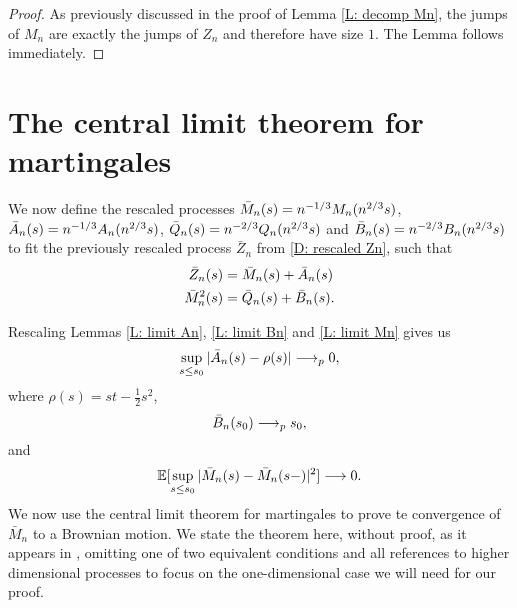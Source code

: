 \begin{proof} \label{P: limit Mn}
	As previously discussed in the proof of Lemma \ref{L: decomp Mn}, 
	the jumps of $M_n$ are exactly the jumps of $Z_n$ and therefore have size $1$. 
	The Lemma follows immediately.
\end{proof}


\section{The central limit theorem for martingales}


We now define the rescaled processes 
$\bar{M}_n(s) = n^{-1 / 3}M_n(n^{2 / 3}s)$, 
$\bar{A}_n(s) = n^{-1 / 3}A_n(n^{2 / 3}s)$, 
$\bar{Q}_n(s) = n^{-2 / 3}Q_n(n^{2 / 3}s)$ and 
$\bar{B}_n(s) = n^{-2 / 3}B_n(n^{2 / 3}s)$ to fit the previously rescaled process 
$\bar{Z}_n$ from \eqref{D: rescaled Zn}, such that
\begin{align*}
\bar{Z}_n(s) &= \bar{M}_n(s) + \bar{A}_n(s) \\
\bar{M}_n^2(s) &= \bar{Q}_n(s) + \bar{B}_n(s).
\end{align*}

Rescaling Lemmas \eqref{L: limit An}, \eqref{L: limit Bn} and \eqref{L: limit Mn} gives us
\begin{equation} \label{E: limit An rescaled}
\sup_{s \leq s_0} |\bar{A}_n(s) - \rho (s)| \longrightarrow_p 0,
\end{equation}
where $\rho (s) = st - \frac{1}{2}s^2$,
\begin{equation} \label{E: limit Bn rescaled}
\bar{B}_n(s_0) \longrightarrow_p s_0,
\end{equation}
and
\begin{equation} \label{E: limit Mn rescaled}
\mathbb{E}[\sup_{s \leq s_0} | \bar{M}_n(s) - \bar{M}_n(s-) |^2 ] \longrightarrow 0.
\end{equation}
We now use the central limit theorem for martingales to prove te convergence of $\bar{M}_n$ to a Brownian motion.
We state the theorem here, without proof, as it appears in \cite[p. 339 f.]{N.Ethier1986},
omitting one of two equivalent conditions and all references to higher dimensional processes to focus on the one-dimensional case we will need for our proof.


